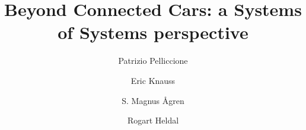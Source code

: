 \documentclass[preprint]{elsarticle}
\begin{document}
\begin{frontmatter}

\title{Beyond Connected Cars: a Systems of Systems perspective
}

\author[uda,gu]{Patrizio Pelliccione}
\author[gu]{Eric Knauss}
\author[gu]{S. Magnus Ågren}
\author[ber]{Rogart Heldal}


\address[uda]{Universit\`a degli Studi dell'Aquila,
  Dipartimento di Informatica,\\
  {\tt patrizio.pelliccione@univaq.it}}
\address[gu]{Chalmers $\mid$ Gothenburg University
  Gothenburg, Sweden\\
  {\tt \{erik.knauss,patrizio.pelliccione\}@gu.se}\\{\tt magnus.agren@chalmers.se}}
\address[ber]{Western Norway University of Applied Sciences,
Bergen, Norway\\
  {\tt rogardt.heldal@hvl.no} } 


\end{frontmatter}














\end{document}

